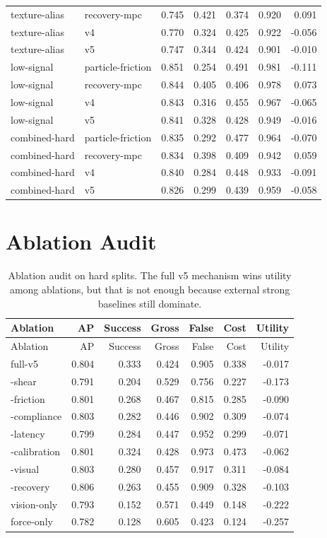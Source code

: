\documentclass{article}
\begin{document}
\begin{longtable}{@{}llrrrrr@{}}
texture-alias & recovery-mpc & 0.745 & 0.421 & 0.374 & 0.920 & 0.091 \\
texture-alias & v4 & 0.770 & 0.324 & 0.425 & 0.922 & -0.056 \\
texture-alias & v5 & 0.747 & 0.344 & 0.424 & 0.901 & -0.010 \\
low-signal & particle-friction & 0.851 & 0.254 & 0.491 & 0.981 & -0.111 \\
low-signal & recovery-mpc & 0.844 & 0.405 & 0.406 & 0.978 & 0.073 \\
low-signal & v4 & 0.843 & 0.316 & 0.455 & 0.967 & -0.065 \\
low-signal & v5 & 0.841 & 0.328 & 0.428 & 0.949 & -0.016 \\
combined-hard & particle-friction & 0.835 & 0.292 & 0.477 & 0.964 & -0.070 \\
combined-hard & recovery-mpc & 0.834 & 0.398 & 0.409 & 0.942 & 0.059 \\
combined-hard & v4 & 0.840 & 0.284 & 0.448 & 0.933 & -0.091 \\
combined-hard & v5 & 0.826 & 0.299 & 0.439 & 0.959 & -0.058 \\
\bottomrule
\end{longtable}


\section{Ablation Audit}

\begin{longtable}{@{}lrrrrrr@{}}
\caption{Ablation audit on hard splits. The full v5 mechanism wins utility among ablations, but that is not enough because external strong baselines still dominate.}\\
\toprule
Ablation & AP & Success & Gross & False & Cost & Utility \\
\midrule
\endfirsthead
\toprule
Ablation & AP & Success & Gross & False & Cost & Utility \\
\midrule
\endhead
full-v5 & 0.804 & 0.333 & 0.424 & 0.905 & 0.338 & -0.017 \\
-shear & 0.791 & 0.204 & 0.529 & 0.756 & 0.227 & -0.173 \\
-friction & 0.801 & 0.268 & 0.467 & 0.815 & 0.285 & -0.090 \\
-compliance & 0.803 & 0.282 & 0.446 & 0.902 & 0.309 & -0.074 \\
-latency & 0.799 & 0.284 & 0.447 & 0.952 & 0.299 & -0.071 \\
-calibration & 0.801 & 0.324 & 0.428 & 0.973 & 0.473 & -0.062 \\
-visual & 0.803 & 0.280 & 0.457 & 0.917 & 0.311 & -0.084 \\
-recovery & 0.806 & 0.263 & 0.455 & 0.909 & 0.328 & -0.103 \\
vision-only & 0.793 & 0.152 & 0.571 & 0.449 & 0.148 & -0.222 \\
force-only & 0.782 & 0.128 & 0.605 & 0.423 & 0.124 & -0.257 \\
\bottomrule
\end{longtable}
\end{document}
